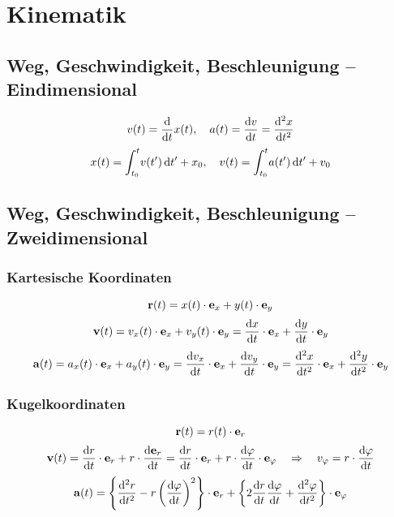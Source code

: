 \section{Kinematik}
\subsection{Weg, Geschwindigkeit, Beschleunigung -- Eindimensional}
\begin{equation}
v(t) = \frac{\mathrm d }{\mathrm d t}x(t), \quad a(t) = \frac{\mathrm d v}{\mathrm d t} = \frac{\mathrm d^2 x}{\mathrm d t^2}
\end{equation}
\begin{equation}
x(t) = \int_{t_0}^t\!v(t^\prime)\,\mathrm{d} t^\prime + x_0, \quad v(t) = \int_{t_0}^t\!a(t^\prime)\,\mathrm{d} t^\prime + v_0
\end{equation}

\subsection{Weg, Geschwindigkeit, Beschleunigung -- Zweidimensional}
\subsubsection{Kartesische Koordinaten}
\begin{equation}
\mathbf{r}(t) = x(t)\cdot \mathbf{e}_{x} + y(t) \cdot \mathbf{e}_{y}
\end{equation}
\begin{equation}
\mathbf{v}(t) = v_x(t)\cdot \mathbf{e}_{x} + v_y(t) \cdot \mathbf{e}_{y} = \frac{\mathrm d x}{\mathrm d t} \cdot \mathbf{e}_{x} + \frac{\mathrm d y}{\mathrm d t} \cdot \mathbf{e}_{y}
\end{equation}
\begin{equation}
\mathbf{a}(t) = a_x(t)\cdot \mathbf{e}_{x} + a_y(t) \cdot \mathbf{e}_{y} = \frac{\mathrm d v_x}{\mathrm d t} \cdot \mathbf{e}_{x} + \frac{\mathrm d v_y}{\mathrm d t} \cdot \mathbf{e}_{y} = \frac{\mathrm d^2 x}{\mathrm d t^2} \cdot \mathbf{e}_{x} + \frac{\mathrm d^2 y}{\mathrm d t^2} \cdot \mathbf{e}_{y}
\end{equation}

\subsubsection{Kugelkoordinaten}
\begin{equation}
\mathbf{r}(t) = r(t)\cdot \mathbf{e}_{r}
\end{equation}
\begin{equation}
\mathbf{v}(t) = \frac{\mathrm d r}{\mathrm d t} \cdot \mathbf{e}_{r} + r \cdot \frac{\mathrm d \mathbf{e}_{r}}{\mathrm d t} = \frac{\mathrm d r}{\mathrm d t} \cdot \mathbf{e}_{r} + r \cdot \frac{\mathrm d \varphi}{\mathrm d t} \cdot \mathbf{e}_{\varphi} \quad\Rightarrow\quad  v_\varphi = r \cdot \frac{\mathrm d \varphi}{\mathrm d t} 
\end{equation}
\begin{equation}
\mathbf{a}(t) = \left\{ \frac{\mathrm d^2 r}{\mathrm d t^2} - r \left( \frac{\mathrm d \varphi}{\mathrm d t} \right)^2 \right\} \cdot \mathbf{e}_{r} + \left\{ 2 \frac{\mathrm d r}{\mathrm d t}\frac{\mathrm d \varphi}{\mathrm d t} + \frac{\mathrm d^2 \varphi}{\mathrm d t^2} \right\} \cdot \mathbf{e}_{\varphi}
\end{equation}


